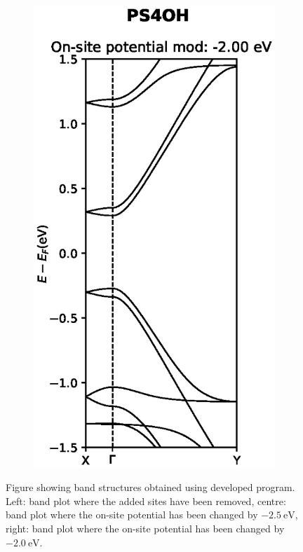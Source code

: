 \begin{figure}[h]
\begin{subfigure}[b]{0.23\textwidth}
    \centering
    \includegraphics[width=\textwidth]{Figures/PS4OHmod2.eps}
    \label{PS4OHdevmod2}
    \end{subfigure}
    \vspace{-2\baselineskip}
    \caption{Figure showing band structures obtained using developed program. Left: band plot where the added sites have been removed, centre: band plot where the on-site potential has been changed by \(\SI{-2.5}{\electronvolt}\), right: band plot where the on-site potential has been changed by \(\SI{-2.0}{\electronvolt}\).} 
    \label{PS4OHdev}
\end{figure}
